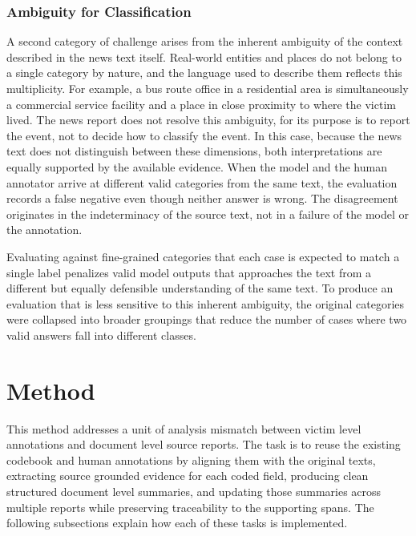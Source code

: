 \documentclass{article}
\begin{document}
\subsubsection{Ambiguity for
Classification}\label{ambiguity-for-classification}

A second category of challenge arises from the inherent ambiguity of the
context described in the news text itself. Real-world entities and
places do not belong to a single category by nature, and the language
used to describe them reflects this multiplicity. For example, a bus
route office in a residential area is simultaneously a commercial
service facility and a place in close proximity to where the victim
lived. The news report does not resolve this ambiguity, for its purpose
is to report the event, not to decide how to classify the event. In this
case, because the news text does not distinguish between these
dimensions, both interpretations are equally supported by the available
evidence. When the model and the human annotator arrive at different
valid categories from the same text, the evaluation records a false
negative even though neither answer is wrong. The disagreement
originates in the indeterminacy of the source text, not in a failure of
the model or the annotation.

Evaluating against fine-grained categories that each case is expected to
match a single label penalizes valid model outputs that approaches the
text from a different but equally defensible understanding of the same
text. To produce an evaluation that is less sensitive to this inherent
ambiguity, the original categories were collapsed into broader groupings
that reduce the number of cases where two valid answers fall into
different classes.

\section{Method}\label{method}


This method addresses a unit of analysis mismatch between victim level annotations and document level source reports. The task is to reuse the existing codebook and human annotations by aligning them with the original texts, extracting source grounded evidence for each coded field, producing clean structured document level summaries, and updating those summaries across multiple reports while preserving traceability to the supporting spans. The following subsections explain how each of these tasks is implemented.
\end{document}
